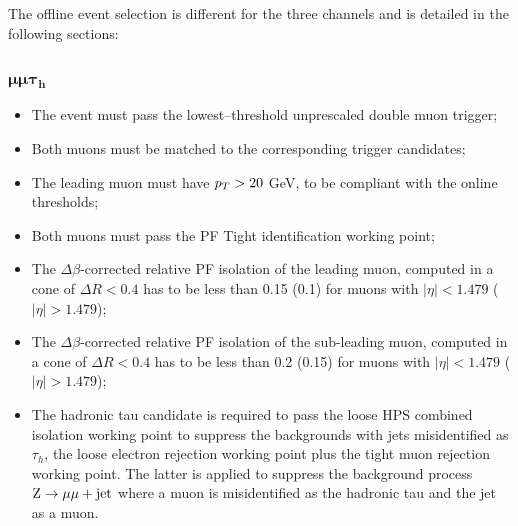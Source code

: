 The offline event selection is different for the three channels and is detailed in the following sections:

\subsubsection{$\boldsymbol{\mu\mu\tau_h}$}
\begin{itemize}
\item The event must pass the lowest--threshold unprescaled double muon trigger;
\item Both muons must be matched to the corresponding trigger candidates;
\item The leading muon must have $p_{T} > 20$ GeV, to be compliant with the online thresholds;
\item Both muons must pass the PF Tight identification working point;
\item The $\Delta \beta$-corrected relative PF isolation of the leading muon, computed in a cone of $\Delta R < 0.4$ has to be less than 0.15 (0.1) for muons with $|\eta| < 1.479$ ($|\eta| > 1.479$);
\item The $\Delta \beta$-corrected relative PF isolation of the sub-leading muon, computed in a cone of $\Delta R < 0.4$ has to be less than 0.2 (0.15) for muons with $|\eta| < 1.479$ ($|\eta| > 1.479$);
\item The hadronic tau candidate is required to pass the loose HPS combined isolation working point to suppress the backgrounds with jets misidentified as $\tau_h$, the loose electron rejection working point plus the tight muon rejection working point. The latter is applied to suppress the background process $\mathrm{Z}\rightarrow\mu\mu+\mathrm{jet}$ where a muon is misidentified as the hadronic tau and the jet as a muon.
\end{itemize}

